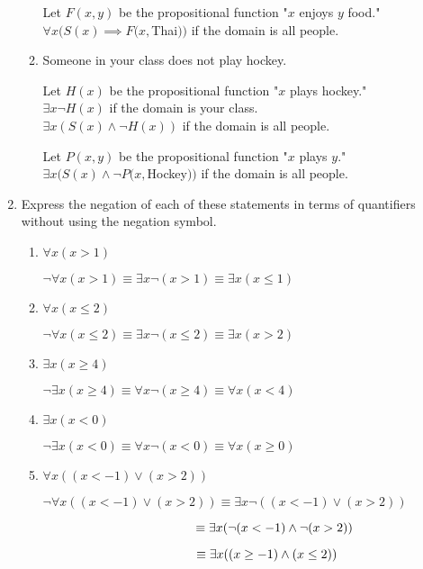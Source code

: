 \documentclass[11pt]{article}
\begin{document}
\begin{enumerate}[label=\textbf{\arabic*.}]
\begin{enumerate}[label=\textbf{\alph*)}]
		Let $F(x, y)$ be the propositional function "$x$ enjoys $y$ food." \\
		$\forall x(S(x) \implies F(x, $Thai$))$ if the domain is all people.
		
		\item Someone in your class does not play hockey.
		
		Let $H(x)$ be the propositional function "$x$ plays hockey." \\
		$\exists x\neg H(x)$ if the domain is your class. \\
		$\exists x(S(x) \land \neg H(x))$ if the domain is all people.
		
		Let $P(x, y)$ be the propositional function "$x$ plays $y$." \\
		$\exists x(S(x) \land \neg P(x, $Hockey$))$ if the domain is all people.
	\end{enumerate}

	\item Express the negation of each of these statements in terms of quantifiers without using the negation symbol.
	\begin{enumerate}[label=\textbf{\alph*)}]
		\item $\forall x(x > 1)$
		
		$\neg \forall x(x > 1) \equiv \exists x\neg(x > 1) \equiv \exists x(x \le 1)$
		
		\item $\forall x(x \le 2)$
		
		$\neg\forall x(x \le 2) \equiv \exists x\neg(x \le 2) \equiv \exists x(x > 2)$
		
		\item $\exists x(x \geq 4)$
		
		$\neg\exists x(x \geq 4) \equiv \forall x\neg(x \geq 4) \equiv \forall x(x < 4)$
		
		\item $\exists x(x < 0)$
		
		$\neg\exists x(x < 0) \equiv \forall x \neg(x < 0) \equiv \forall x(x \geq 0)$
		
		\item $\forall x((x < -1) \lor (x > 2))$
		
		$\neg\forall x((x < -1) \lor (x > 2)) \equiv \exists x\neg((x < -1) \lor (x > 2))$
		
		$\hspace{4.26cm}\equiv \exists x(\neg(x < -1) \land \neg(x > 2))$
		
		$\hspace{4.26cm}\equiv \exists x((x \geq -1) \land (x \leq 2))$
		

\end{enumerate}
\end{enumerate}
\end{document}
